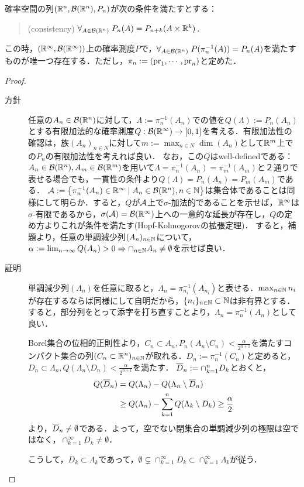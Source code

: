 \documentclass[uplatex,dvipdfmx]{jsreport}
\begin{document}
\begin{theorem}\label{thm-Kolmogorov-extension-theorem}
    確率空間の列$(\mathbb{R}^n,\mathcal{B}(\mathbb{R}^n),P_n)$が次の条件を満たすとする：
    \begin{quote}
        (consistency) $\forall_{A\in\mathcal{B}(\mathbb{R}^n)}\;P_n(A)=P_{n+k}(A\times\mathbb{R}^k)$．
    \end{quote}
    この時，$(\mathbb{R}^\infty,\mathcal{B}(\mathbb{R}^\infty))$上の確率測度$P$で，$\forall_{A\in\mathcal{B}(\mathbb{R}^n)}\;P(\pi_n^{-1}(A))=P_n(A)$を満たすものが唯一つ存在する．ただし，$\pi_n:=(\mathrm{pr}_1,\cdots,\mathrm{pr}_n)$と定めた．
\end{theorem}
\begin{proof}\mbox{}
    \begin{description}
        \item[方針] 任意の$A_n\in\mathcal{B}(\mathbb{R}^n)$に対して，$\Lambda:=\pi^{-1}_n(A_n)$での値を$Q(\Lambda):=P_n(A_n)$とする有限加法的な確率測度$Q:\mathcal{B}(\mathbb{R}^\infty)\to[0,1]$を考える．有限加法性の確認は，族$(A_n)_{n\in N}$に対して$m:=\max_{n\in N}\dim(A_n)$として$\mathbb{R}^m$上での$P_n$の有限加法性を考えれば良い．
        なお，この$Q$はwell-definedである：$A_n\in\mathcal{B}(\mathbb{R}^n),A_m\in\mathcal{B}(\mathbb{R}^m)$を用いて$\Lambda=\pi^{-1}_n(A_n)=\pi^{-1}_m(A_m)$と２通りで表せる場合でも，一貫性の条件より$Q(\Lambda)=P_n(A_n)=P_m(A_m)$である．
        $\mathcal{A}:=\left\{\pi^{-1}_n(A_n)\in\mathbb{R}^\infty\mid A_n\in\mathcal{B}(\mathbb{R}^n),n\in\mathbb{N}\right\}$は集合体であることは同様にして明らか．すると，$Q$が$\mathcal{A}$上で$\sigma$-加法的であることを示せば，$\mathbb{R}^\infty$は$\sigma$-有限であるから，$\sigma(\mathcal{A})=\mathcal{B}(\mathbb{R}^\infty)$上への一意的な延長が存在し，$Q$の定め方よりこれが条件を満たす(Hopf-Kolmogorovの拡張定理)．
        すると，補題より，任意の単調減少列$(A_n)_{n\in\mathbb{N}}$について，$\alpha:=\lim_{n\to\infty}Q(A_n)>0\Rightarrow\cap_{n\in\mathbb{N}}A_n\ne\emptyset$を示せば良い．
        \item[証明]
        単調減少列$(\Lambda_n)$を任意に取ると，$\Lambda_n=\pi^{-1}_{n_i}(A_{n_i})$と表せる．$\max_{n\in\mathbb{N}}n_i$が存在するならば同様にして自明だから，$\{n_i\}_{n\in\mathbb{N}}\subset\mathbb{N}$は非有界とする．すると，部分列をとって添字を打ち直すことより，$\Lambda_n=\pi^{-1}_n(A_n)$として良い．

        Borel集合の位相的正則性より，$C_n\subset A_n,P_n(A_n\setminus C_n)<\frac{\alpha}{2^{n+1}}$を満たすコンパクト集合の列$(C_n\subset\mathbb{R}^n)_{n\in\mathbb{N}}$が取れる．$D_n:=\pi^{-1}_n(C_n)$と定めると，$D_n\subset\Lambda_n,Q(\Lambda_n\setminus D_n)<\frac{\alpha}{2^{n+1}}$を満たす．
        $\overline{D}_n:=\cap_{k=1}^nD_k$とおくと，
        \begin{align*}
            Q(\overline{D}_n)&=Q(\Lambda_n)-Q(\Lambda_n\setminus\overline{D}_n)\\
            &\ge Q(\Lambda_n)-\sum^n_{k=1}Q(\Lambda_k\setminus D_k)\ge\frac{\alpha}{2}
        \end{align*}
        より，$\overline{D}_n\ne\emptyset$である．よって，空でない閉集合の単調減少列の極限は空ではなく，$\cap^\infty_{k=1}D_k\ne\emptyset$．

        こうして，$D_k\subset\Lambda_k$であって，$\emptyset\subsetneq\cap^\infty_{k=1}D_k\subset\cap^\infty_{k=1}\Lambda_k$が従う．
    \end{description}
\end{proof}
\end{document}
